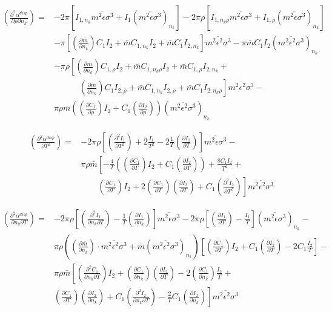 \documentclass[internal,english]{sintefmemo2012}
\newcommand*{\pder}[2]{\left(\frac{\partial #1}{\partial #2}\right)}
\newcommand*{\pdder}[2]{\left(\frac{\partial^2 #1}{\partial #2^2}\right)}
\newcommand*{\pdcross}[3]{\left(\frac{\partial^2 #1}{\partial #2 \partial #3}\right)}
\newcommand{\lp}{\left(}
\newcommand{\rp}{\right)}
\begin{document}
\begin{equation}
  \begin{aligned}
    \pdcross{\alpha^{disp}}{\rho}{n_k} =& -2 \pi \left[ I_{1,n_k} \overline{m^2 \epsilon \sigma^3} + I_1 (\overline{m^2 \epsilon \sigma^3})_{n_k} \right] -2 \pi \rho \left[ I_{1,n_k \rho} \overline{m^2 \epsilon \sigma^3} + I_{1,\rho} (\overline{m^2 \epsilon \sigma^3})_{n_k} \right] \\
    &- \pi \left[ \pder{\bar m}{n_k} C_1 I_2 + \bar m C_{1,n_k} I_2 + \bar m C_1 I_{2,n_k} \right] \overline{m^2 \epsilon^2 \sigma^3} - \pi \bar m C_1 I_2 (\overline{m^2 \epsilon^2 \sigma^3})_{n_k} \\
    &- \pi \rho \left[ \pder{\bar m}{n_k} C_{1,\rho} I_2 + \bar m C_{1,n_k \rho} I_2 + \bar m C_{1,\rho} I_{2,n_k} + \right. \\
    & \qquad \quad  \left. \pder{\bar m}{n_k} C_1 I_{2,\rho} + \bar m C_{1,n_k} I_{2,\rho} + \bar m C_1 I_{2,n_k \rho} \right] \overline{m^2 \epsilon^2 \sigma^3} - \\
    & \pi \rho \bar m \lp \pder{C_1}{\rho} I_2 + C_1 \pder{I_2}{\rho} \rp (\overline{m^2 \epsilon^2 \sigma^3})_{n_k}
  \end{aligned}
\end{equation}


\begin{equation}
  \begin{aligned}
    \pdder{\alpha^{disp}}{T} =& -2 \pi \rho \left[ \pdder{I_1}{T} + 2 \frac{I_1}{T^2} - 2 \frac{1}{T} \pder{I_1}{T} \right] \overline{m^2 \epsilon \sigma^3} -  \\
    & \pi \rho \bar m \left[ -\frac{4}{T} \lp \pder{C_1}{T} I_2 + C_1 \pder{I_2}{T} \rp + \frac{8 C_1 I_2}{T^2} +\right. \\
    & \qquad \left. \pder{C_1}{T} I_2 + 2 \pder{C_1}{T} \pder{I_2}{T} + C_1 \pdder{I_2}{T} \right] \overline{m^2 \epsilon^2 \sigma^3}
  \end{aligned}
\end{equation}

\begin{equation}
  \begin{aligned}
    \pdcross{\alpha^{disp}}{n_k}{T} =& -2 \pi \rho \left[ \pdcross{I_1}{n_k}{T} - \frac{1}{T} \pder{I_1}{n_k} \right] \overline{m^2 \epsilon \sigma^3} -2 \pi \rho \left[ \pder{I_1}{T} - \frac{I_1}{T} \right] (\overline{m^2 \epsilon \sigma^3})_{n_k} - \\
    & \pi \rho \lp \pder{\bar m}{n_k} \cdot \overline{m^2 \epsilon^2 \sigma^3} + \bar m (\overline{m^2 \epsilon^2 \sigma^3})_{n_k} \rp \left[ \pder{C_1}{T} I_2 + C_1 \pder{I_2}{T} - 2 C_1 \frac{I_2}{T}\right] -\\
    & \pi \rho \bar m \left[ \pdcross{C_1}{n_k}{T} I_2 + \pder{C_1}{n_k} \pder{I_2}{T} - 2 \pder{C_1}{n_k} \frac{I_2}{T} + \right. \\
    & \left. \pder{C_1}{T} \pder{I_2}{n_k} + C_1 \pdcross{I_2}{n_k}{T} - \frac{2}{T} C_1 \pder{I_2}{n_k} \right] \overline{m^2 \epsilon^2 \sigma^3}
  \end{aligned}
\end{equation}
\end{document}
